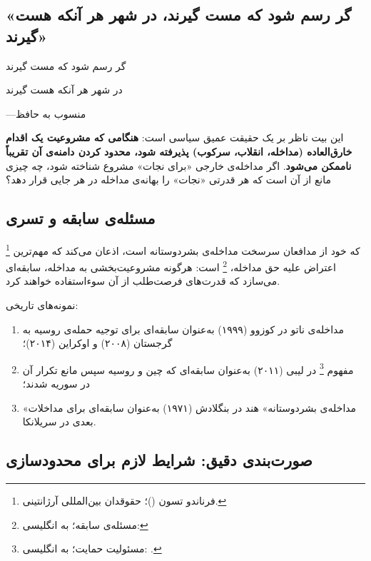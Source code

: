 \subsection{«گر رسم شود که مست گیرند، در شهر هر آنکه هست گیرند»}
\label{subsec:ch02-t8-proverb}

\begin{tcolorbox}[quotebox, title={}]
	{\large
		گر رسم شود که مست گیرند
		
		در شهر هر آنکه هست گیرند}
	
	\hfill ---منسوب به حافظ
\end{tcolorbox}

این بیت ناظر بر یک حقیقت عمیق سیاسی است: \textbf{هنگامی که
	مشروعیت یک اقدام خارق‌العاده (مداخله، انقلاب، سرکوب) پذیرفته
	شود، محدود کردن دامنه‌ی آن تقریباً ناممکن می‌شود}. اگر مداخله‌ی
خارجی «برای نجات» مشروع شناخته شود، چه چیزی مانع از آن است که
هر قدرتی «نجات» را بهانه‌ی مداخله در هر جایی قرار دهد؟

\subsection{مسئله‌ی سابقه و تسری}
\label{subsec:ch02-t8-precedent}

%
\footnote{%
	فرناندو تسون ()؛%
	حقوقدان بین‌المللی آرژانتینی.%
}%
که خود از مدافعان سرسخت مداخله‌ی بشردوستانه است، اذعان
می‌کند که مهم‌ترین اعتراض علیه حق مداخله،
%
\footnote{مسئله‌ی سابقه؛ به انگلیسی: }%
است: هرگونه مشروعیت‌بخشی به مداخله، سابقه‌ای می‌سازد که
قدرت‌های فرصت‌طلب از آن سوءاستفاده خواهند
کرد.

نمونه‌های تاریخی:
\begin{enumerate}[label=\textbf{\arabic*.}, nosep, rightmargin=1em]
	\item مداخله‌ی ناتو در کوزوو (۱۹۹۹) به‌عنوان سابقه‌ای برای
	توجیه حمله‌ی روسیه به گرجستان (۲۰۰۸) و اوکراین (۲۰۱۴)؛
	\item مفهوم %
	\footnote{مسئولیت حمایت؛ به انگلیسی:
		.}
	در لیبی (۲۰۱۱) به‌عنوان سابقه‌ای که چین و روسیه سپس مانع
	تکرار آن در سوریه شدند؛
	\item «مداخله‌ی بشردوستانه» هند در بنگلادش (۱۹۷۱) به‌عنوان
	سابقه‌ای برای مداخلات بعدی در سریلانکا.
\end{enumerate}

\subsection{صورت‌بندی دقیق: شرایط لازم برای محدودسازی}
\label{subsec:ch02-t8-formulation}

